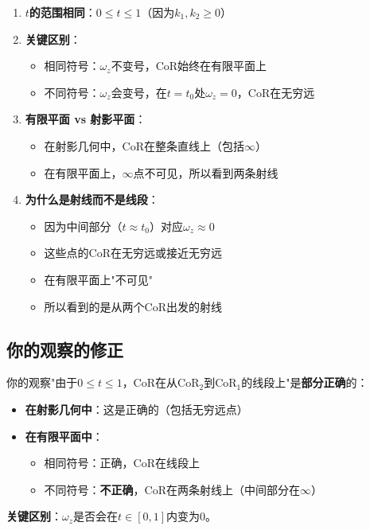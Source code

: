 \documentclass[12pt,a4paper]{article}
\begin{document}
\begin{enumerate}
\item \textbf{$t$的范围相同}：$0 \leq t \leq 1$（因为$k_1, k_2 \geq 0$）

\item \textbf{关键区别}：
   \begin{itemize}
   \item 相同符号：$\omega_z$不变号，CoR始终在有限平面上
   \item 不同符号：$\omega_z$会变号，在$t = t_0$处$\omega_z = 0$，CoR在无穷远
   \end{itemize}

\item \textbf{有限平面 vs 射影平面}：
   \begin{itemize}
   \item 在射影几何中，CoR在整条直线上（包括$\infty$）
   \item 在有限平面上，$\infty$点不可见，所以看到两条射线
   \end{itemize}

\item \textbf{为什么是射线而不是线段}：
   \begin{itemize}
   \item 因为中间部分（$t \approx t_0$）对应$\omega_z \approx 0$
   \item 这些点的CoR在无穷远或接近无穷远
   \item 在有限平面上"不可见"
   \item 所以看到的是从两个CoR出发的射线
   \end{itemize}
\end{enumerate}

\subsection{你的观察的修正}

你的观察"由于$0 \leq t \leq 1$，CoR在从CoR$_2$到CoR$_1$的线段上"是\textbf{部分正确}的：

\begin{itemize}
\item \textbf{在射影几何中}：这是正确的（包括无穷远点）
\item \textbf{在有限平面中}：
  \begin{itemize}
  \item 相同符号：正确，CoR在线段上
  \item 不同符号：\textbf{不正确}，CoR在两条射线上（中间部分在$\infty$）
  \end{itemize}
\end{itemize}

\textbf{关键区别}：$\omega_z$是否会在$t \in [0, 1]$内变为0。
\end{document}
